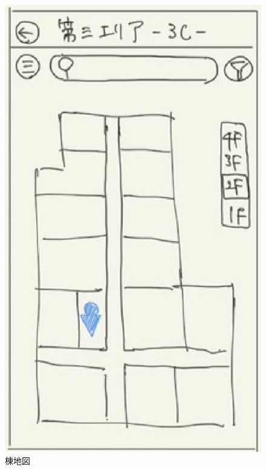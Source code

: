 \documentclass[12pt,a4paper,dvipdf]{jsarticle}
\begin{document}
\begin{figure}[H]
\begin{minipage}[b]{0.24\columnwidth}
        \includegraphics[width=0.9\columnwidth]{./img/棟地図.png}
        \caption{棟地図}
        \label{fig:棟地図}
    \end{minipage}
    \begin{minipage}[b]{0.24\columnwidth}
        \centering

\end{minipage}
\end{figure}
\end{document}
